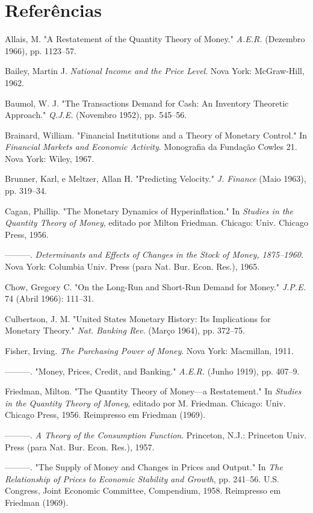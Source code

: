 \documentclass[12pt]{article}
\begin{document}
\section*{Referências}

Allais, M. "A Restatement of the Quantity Theory of Money." \textit{A.E.R.} (Dezembro 1966), pp. 1123–57.

Bailey, Martin J. \textit{National Income and the Price Level}. Nova York: McGraw-Hill, 1962.

Baumol, W. J. "The Transactions Demand for Cash: An Inventory Theoretic Approach." \textit{Q.J.E.} (Novembro 1952), pp. 545–56.

Brainard, William. "Financial Institutions and a Theory of Monetary Control." In \textit{Financial Markets and Economic Activity}. Monografia da Fundação Cowles 21. Nova York: Wiley, 1967.

Brunner, Karl, e Meltzer, Allan H. "Predicting Velocity." \textit{J. Finance} (Maio 1963), pp. 319–34.

Cagan, Phillip. "The Monetary Dynamics of Hyperinflation." In \textit{Studies in the Quantity Theory of Money}, editado por Milton Friedman. Chicago: Univ. Chicago Press, 1956.

———. \textit{Determinants and Effects of Changes in the Stock of Money, 1875–1960}. Nova York: Columbia Univ. Press (para Nat. Bur. Econ. Res.), 1965.

Chow, Gregory C. "On the Long-Run and Short-Run Demand for Money." \textit{J.P.E.} 74 (Abril 1966): 111–31.

Culbertson, J. M. "United States Monetary History: Its Implications for Monetary Theory." \textit{Nat. Banking Rev.} (Março 1964), pp. 372–75.

Fisher, Irving. \textit{The Purchasing Power of Money}. Nova York: Macmillan, 1911.

———. "Money, Prices, Credit, and Banking." \textit{A.E.R.} (Junho 1919), pp. 407–9.

Friedman, Milton. "The Quantity Theory of Money—a Restatement." In \textit{Studies in the Quantity Theory of Money}, editado por M. Friedman. Chicago: Univ. Chicago Press, 1956. Reimpresso em Friedman (1969).

———. \textit{A Theory of the Consumption Function}. Princeton, N.J.: Princeton Univ. Press (para Nat. Bur. Econ. Res.), 1957.

———. "The Supply of Money and Changes in Prices and Output." In \textit{The Relationship of Prices to Economic Stability and Growth}, pp. 241–56. U.S. Congress, Joint Economic Committee, Compendium, 1958. Reimpresso em Friedman (1969).
\end{document}
